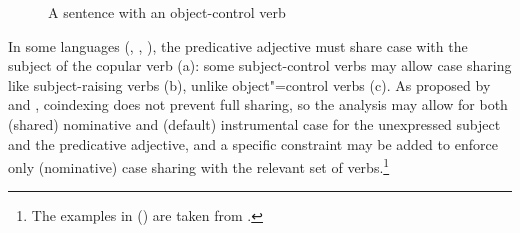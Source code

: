 \begin{figure}
\caption{\label{cons3}A sentence with an object-control verb}
\end{figure}

In some  languages (, , ), the predicative adjective must share case with the subject of the copular verb (a): some subject-control
verbs may allow case sharing like subject-raising verbs (b), unlike object"=control verbs (c).
As proposed by \citet{Przepiorkowski2004} and
\citet{PrzepiorkowskiandRosen2005}, coindexing does not prevent full sharing, so the analysis may
allow for both (shared) nominative and (default) instrumental case for the unexpressed subject and the predicative adjective, and a specific constraint may be added to enforce only (nominative) case sharing with the relevant set of verbs.\footnote{%
   The examples in () are taken from .
}

